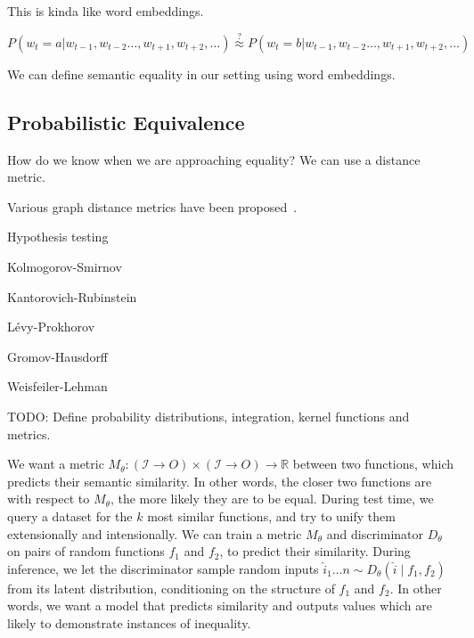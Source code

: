 \documentclass[11pt]{article}
\begin{document}
    This is kinda like word embeddings.

    $P(w_t = a | w_{t-1}, w_{t-2}\ldots, w_{t+1}, w_{t+2}, \ldots)\overset{?}{\approx} P(w_t = b | w_{t-1}, w_{t-2}\ldots, w_{t+1}, w_{t+2}, \ldots)$

    We can define semantic equality in our setting using word embeddings.

%
%

    \subsection{Probabilistic Equivalence}\label{sec:probabilistic}

    How do we know when we are approaching equality? We can use a distance metric.


    Various graph distance metrics have been proposed~\citet{sanfeliu1983distance}.

    Hypothesis testing

    Kolmogorov-Smirnov

    Kantorovich-Rubinstein

    L\'evy-Prokhorov

    Gromov-Hausdorff

    Weisfeiler-Lehman

    TODO: Define probability distributions, integration, kernel functions and metrics.

    We want a metric $M_\theta: (\mathcal{I}\rightarrow{O}) \times (\mathcal{I}\rightarrow{O})\rightarrow \mathbb{R}$ between two functions, which predicts their semantic similarity. In other words, the closer two functions are with respect to $M_\theta$, the more likely they are to be equal. During test time, we query a dataset for the $k$ most similar functions, and try to unify them extensionally and intensionally. We can train a metric $M_\theta$ and discriminator $D_\theta$ on pairs of random functions $f_1$ and $f_2$, to predict their similarity. During inference, we let the discriminator sample random inputs $\hat i_1 \ldots n \sim D_\theta(\hat i \mid f_1, f_2)$ from its latent distribution, conditioning on the structure of $f_1$ and $f_2$. In other words, we want a model that predicts similarity and outputs values which are likely to demonstrate instances of inequality.
\end{document}
